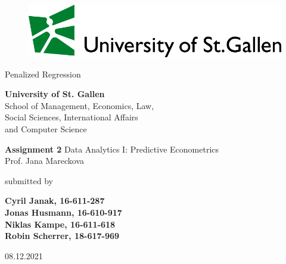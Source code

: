 \begin{center}
\begin{figure}[htb]
  \centering
  \def\svgwidth{450pt}
  \scriptsize{\includegraphics[width=15cm]{rmarkdown/logo-hsg-neu-en.pdf}}
\end{figure}
\end{center}

\medskip
\begin{center}
  \huge{Penalized Regression}
\end{center}

\medskip
\begin{center}
  \normalsize{\textbf{University of St. Gallen}\\
              School of Management, Economics, Law,\\
              Social Sciences, International Affairs \\
              and Computer Science}
\end{center}

\medskip
\begin{center}
\textbf{\Large{Assignment 2}}
\linebreak
\linebreak
\normalsize{Data Analytics I: Predictive Econometrics\\
            Prof. Jana Mareckova}
\end{center}
\medskip
\begin{center}
  submitted by
\end{center}
\medskip
\begin{center}
  \Large{\textbf{Cyril Janak, 16-611-287}}\\
  \Large{\textbf{Jonas Husmann, 16-610-917}}\\
  \Large{\textbf{Niklas Kampe, 16-611-618}}\\
  \Large{\textbf{Robin Scherrer, 18-617-969}}
\end{center}

\vspace*{\fill}
\begin{center}
\large{08.12.2021}
\end{center}